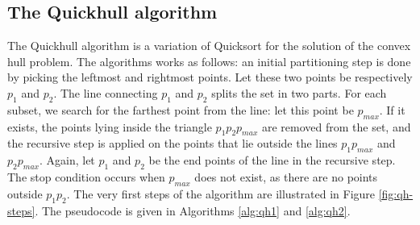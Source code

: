 \documentclass[]{finalproject}
\begin{document}
\subsection{The Quickhull algorithm}
The Quickhull algorithm is a variation of Quicksort for the solution of the convex hull problem.
The algorithms works as follows:
an initial partitioning step is done by picking the leftmost and rightmost points.
Let these two points be respectively $p_1$ and $p_2$.
The line connecting $p_1$ and $p_2$ splits the set in two parts.
For each subset, we search for the farthest point from the line: let this point be $p_{max}$.
If it exists, the points lying inside the triangle $p_1p_2p_{max}$ are removed from the set,
and the recursive step is applied on the points that lie outside the lines $p_1p_{max}$ and $p_2p_{max}$.
Again, let $p_1$ and $p_2$ be the end points of the line in the recursive step.
The stop condition occurs when $p_{max}$ does not exist, as there are no points outside $p_1p_2$.
The very first steps of the algorithm are illustrated in Figure \ref{fig:qh-steps}.
The pseudocode is given in Algorithms \ref{alg:qh1} and \ref{alg:qh2}.
\end{document}
